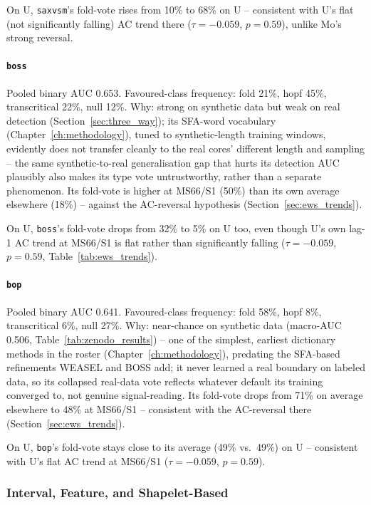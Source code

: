 On U, \texttt{saxvsm}'s fold-vote rises from 10\% to 68\% on U -- consistent with U's flat (not significantly falling) AC trend there ($\tau=-0.059$, $p=0.59$), unlike Mo's strong reversal.

\paragraph{\texttt{boss}} Pooled binary AUC 0.653. Favoured-class frequency: fold 21\%, hopf 45\%, transcritical 22\%, null 12\%. Why: strong on synthetic data but weak on real detection (Section~\ref{sec:three_way}); its SFA-word vocabulary (Chapter~\ref{ch:methodology}), tuned to synthetic-length training windows, evidently does not transfer cleanly to the real cores' different length and sampling -- the same synthetic-to-real generalisation gap that hurts its detection AUC plausibly also makes its type vote untrustworthy, rather than a separate phenomenon. Its fold-vote is higher at MS66/S1 (50\%) than its own average elsewhere (18\%) -- against the AC-reversal hypothesis (Section~\ref{sec:ews_trends}).

On U, \texttt{boss}'s fold-vote drops from 32\% to 5\% on U too, even though U's own lag-1 AC trend at MS66/S1 is flat rather than significantly falling ($\tau=-0.059$, $p=0.59$, Table~\ref{tab:ews_trends}).

\paragraph{\texttt{bop}} Pooled binary AUC 0.641. Favoured-class frequency: fold 58\%, hopf 8\%, transcritical 6\%, null 27\%. Why: near-chance on synthetic data (macro-AUC 0.506, Table~\ref{tab:zenodo_results}) -- one of the simplest, earliest dictionary methods in the roster (Chapter~\ref{ch:methodology}), predating the SFA-based refinements WEASEL and BOSS add; it never learned a real boundary on labeled data, so its collapsed real-data vote reflects whatever default its training converged to, not genuine signal-reading. Its fold-vote drops from 71\% on average elsewhere to 48\% at MS66/S1 -- consistent with the AC-reversal there (Section~\ref{sec:ews_trends}).

On U, \texttt{bop}'s fold-vote stays close to its average (49\% vs.\ 49\%) on U -- consistent with U's flat AC trend at MS66/S1 ($\tau=-0.059$, $p=0.59$).

\subsubsection{Interval, Feature, and Shapelet-Based}

